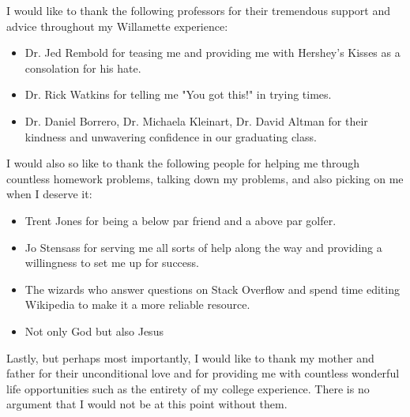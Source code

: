 I would like to thank the following professors for their tremendous support and advice throughout my Willamette experience:
\begin{itemize}
    \item Dr. Jed Rembold for teasing me and providing me with Hershey's Kisses as a consolation for his hate.
    \item Dr. Rick Watkins for telling me "You got this!" in trying times.
    \item Dr. Daniel Borrero, Dr. Michaela Kleinart, Dr. David Altman for their kindness and unwavering confidence in our graduating class.
\end{itemize}

I would also so like to thank the following people for helping me through countless homework problems, talking down my problems, and also picking on me when I deserve it:

\begin{itemize}
    \item Trent Jones for being a below par friend and a above par golfer.
    \item Jo Stensass for serving me all sorts of help along the way and providing a willingness to set me up for success.
    \item The wizards who answer questions on Stack Overflow and spend time editing Wikipedia to make it a more reliable resource.
    \item Not only God but also Jesus
\end{itemize}

Lastly, but perhaps most importantly, I would like to thank my mother and father for their unconditional love and for providing me with countless wonderful life opportunities such as the entirety of my college experience.  There is no argument that I would not be at this point without them.